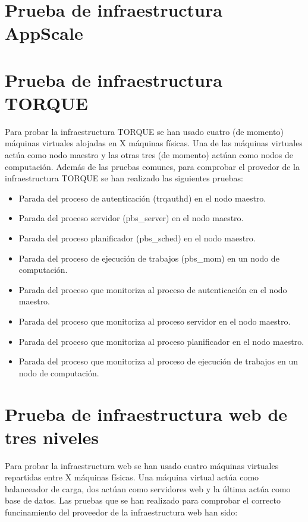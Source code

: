 \section{Prueba de infraestructura AppScale}


\section{Prueba de infraestructura TORQUE}

Para probar la infraestructura TORQUE se han usado cuatro (de momento) máquinas virtuales alojadas en X máquinas físicas. Una de las máquinas virtuales actúa como nodo maestro y las otras tres (de momento) actúan como nodos de computación. Además de las pruebas comunes, para comprobar el provedor de la infraestructura TORQUE se han realizado las siguientes pruebas:

\begin{itemize}
\item Parada del proceso de autenticación (trqauthd) en el nodo maestro.
\item Parada del proceso servidor (pbs\_server) en el nodo maestro.
\item Parada del proceso planificador (pbs\_sched) en el nodo maestro.
\item Parada del proceso de ejecución de trabajos (pbs\_mom) en un nodo de computación.
\item Parada del proceso que monitoriza al proceso de autenticación en el nodo maestro.
\item Parada del proceso que monitoriza al proceso servidor en el nodo maestro.
\item Parada del proceso que monitoriza al proceso planificador en el nodo maestro.
\item Parada del proceso que monitoriza al proceso de ejecución de trabajos en un nodo de computación.
\end{itemize}


\section{Prueba de infraestructura web de tres niveles}

Para probar la infraestructura web se han usado cuatro máquinas virtuales repartidas entre X máquinas físicas. Una máquina virtual actúa como balanceador de carga, dos actúan como servidores web y la última actúa como base de datos. Las pruebas que se han realizado para comprobar el correcto funcinamiento del proveedor de la infraestructura web han sido:


